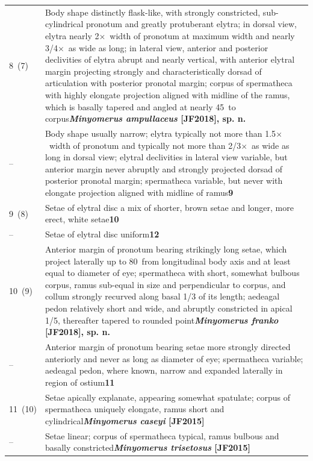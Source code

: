 \documentclass[fleqn,10pt,lineno]{wlpeerj} %
\newcommand{\td}{\textdegree~}
\newcommand{\x}{$\times$~}
\newcommand{\breakfill}{\dotfill\newline\penalty0\hbox{}\nobreak\dotfill}
\begin{document}
\begin{xtabular}{@{}
                p{\dimexpr.1\textwidth-\tabcolsep\relax}
                p{\dimexpr.9\textwidth-\tabcolsep\relax}@{}}
		{8~(7)} & {Body shape distinctly flask-like, with strongly constricted, sub-cylindrical pronotum and greatly protuberant elytra; in dorsal view, elytra nearly 2\x width of pronotum at maximum width and nearly 3/4\x as wide as long; in lateral view, anterior and posterior declivities of elytra abrupt and nearly vertical, with anterior elytral margin projecting strongly and characteristically dorsad of articulation with posterior pronotal margin; corpus of spermatheca with highly elongate projection aligned with midline of the ramus, which is basally tapered and angled at nearly 45\td to corpus}{\dotfill}{\textbf{\textit{Minyomerus ampullaceus} [JF2018], sp. n.}}\\
		{--} & {Body shape usually narrow; elytra typically not more than 1.5\x width of pronotum and typically not more than 2/3\x as wide as long in dorsal view; elytral declivities in lateral view variable, but anterior margin never abruptly and strongly projected dorsad of posterior pronotal margin; spermatheca variable, but never with elongate projection aligned with midline of ramus}{\dotfill}{\textbf{9}}\\
		
		{9~(8)} & {Setae of elytral disc a mix of shorter, brown setae and longer, more erect, white setae}{\dotfill}{\textbf{10}}\\
		{--} & {Setae of elytral disc uniform}{\dotfill}{\textbf{12}}\\
		
		{10~(9)} & {Anterior margin of pronotum bearing strikingly long setae, which project laterally up to 80\td from longitudinal body axis and at least equal to diameter of eye;	spermatheca with short, somewhat bulbous corpus, ramus sub-equal in size and perpendicular to corpus, and collum strongly recurved along basal 1/3 of its length; aedeagal pedon relatively short and wide, and abruptly constricted in apical 1/5, thereafter tapered to rounded point}{\breakfill}{\textbf{\textit{Minyomerus franko} [JF2018], sp. n.}}\\
		{--} & {Anterior margin of pronotum bearing setae more strongly directed anteriorly and never as long as diameter of eye; spermatheca variable; aedeagal pedon, where known, narrow and expanded laterally in region of ostium}{\dotfill}{\textbf{11}}\\
		
		{11~(10)} & {Setae apically explanate, appearing somewhat spatulate; corpus of spermatheca uniquely elongate, ramus short and cylindrical}{\dotfill}{\textbf{\textit{Minyomerus caseyi} [JF2015]}}\\
		{--} & {Setae linear; corpus of spermatheca typical, ramus bulbous and basally constricted}{\breakfill}{\textbf{\textit{Minyomerus trisetosus} [JF2015]}}\\
		

\end{xtabular}
\end{document}
